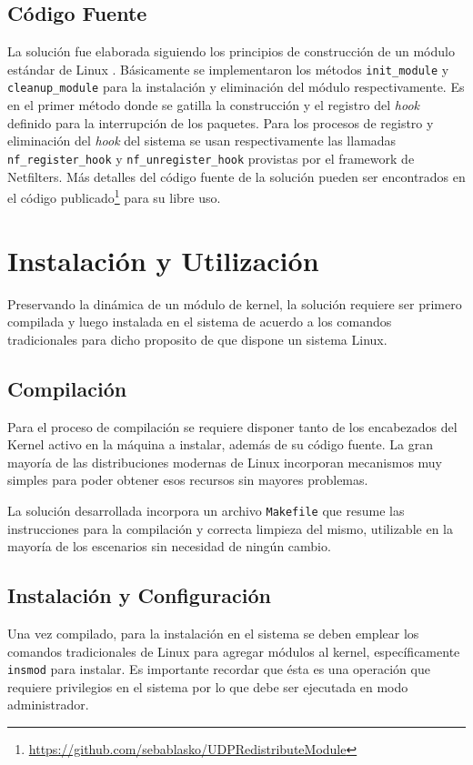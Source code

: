 \subsection{Código Fuente}
La solución fue elaborada siguiendo los principios de construcción de un módulo estándar de Linux \cite{report:netfilterModule}. Básicamente se implementaron los métodos \verb=init_module= y \verb=cleanup_module= para la instalación y eliminación del módulo respectivamente. Es en el primer método donde se gatilla la construcción y el registro del \emph{hook} definido para la interrupción de los paquetes. Para los procesos de registro y eliminación del \emph{hook} del sistema se usan respectivamente las llamadas \verb=nf_register_hook= y \verb=nf_unregister_hook= provistas por el framework de Netfilters. Más detalles del código fuente de la solución pueden ser encontrados en el código publicado\footnote{\url{https://github.com/sebablasko/UDPRedistributeModule}} para su libre uso.


\section{Instalación y Utilización}
Preservando la dinámica de un módulo de kernel, la solución requiere ser primero compilada y luego instalada en el sistema de acuerdo a los comandos tradicionales para dicho proposito de que dispone un sistema Linux.

\subsection{Compilación}
Para el proceso de compilación se requiere disponer tanto de los encabezados del Kernel activo en la máquina a instalar, además de su código fuente. La gran mayoría de las distribuciones modernas de Linux incorporan mecanismos muy simples para poder obtener esos recursos sin mayores problemas.

La solución desarrollada incorpora un archivo \verb=Makefile= que resume las instrucciones para la compilación y correcta limpieza del mismo, utilizable en la mayoría de los escenarios sin necesidad de ningún cambio.

\subsection{Instalación y Configuración}
Una vez compilado, para la instalación en el sistema se deben emplear los comandos tradicionales de Linux para agregar módulos al kernel, específicamente \verb=insmod= para instalar. Es importante recordar que ésta es una operación que requiere privilegios en el sistema por lo que debe ser ejecutada en modo administrador.

